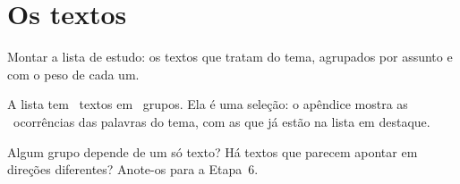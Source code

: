 \chapter{Os textos}

\begin{objetivo}
Montar a lista de estudo: os textos que tratam do tema, agrupados por assunto
e com o peso de cada um.
\end{objetivo}

A lista tem \temaNTextos\ textos em \temaNGrupos\ grupos. Ela é uma seleção:
o apêndice mostra as \temaNOcorrencias\ ocorrências das palavras do tema, com
as que já estão na lista em destaque.

\textosdotema

\begin{pergunta}
Algum grupo depende de um só texto? Há textos que parecem apontar em
direções diferentes? Anote-os para a Etapa~6.
\end{pergunta}
